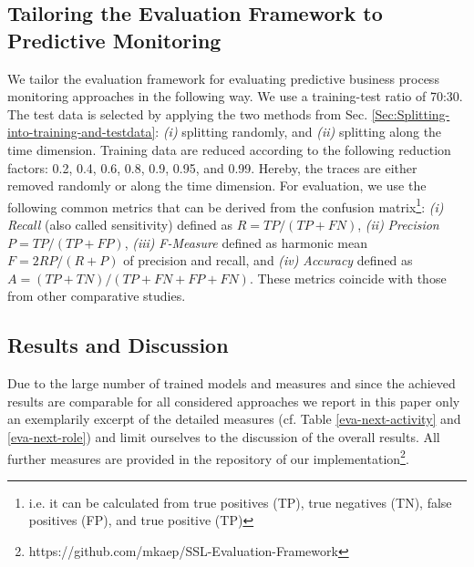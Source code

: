 \documentclass[runningheads]{llncs}
\begin{document}
\subsection{Tailoring the Evaluation Framework to Predictive Monitoring}
\vspace{-5pt}
We tailor the evaluation framework for evaluating predictive business process monitoring approaches in the following way. We use a training-test ratio of 70:30. The test data is selected by applying the two methods from Sec. \ref{Sec:Splitting-into-training-and-testdata}: \textit{(i)} splitting randomly, and \textit{(ii)} splitting along the time dimension. Training data are reduced according to the following reduction factors: 0.2, 0.4, 0.6, 0.8, 0.9, 0.95, and 0.99. Hereby, the traces are either removed randomly or along the time dimension. For evaluation, we use the following common metrics that can be derived from the confusion matrix\footnote{i.e. it can be calculated from true positives (TP), true negatives (TN), false positives (FP), and true positive (TP)}: \textit{(i)} \textit{Recall} (also called sensitivity) defined as $R = TP/(TP+FN)$, \textit{(ii)} \textit{Precision} $P = TP/(TP+FP)$, \textit{(iii)} \textit{F-Measure} defined as harmonic mean $F =2RP/(R+P)$ of precision and recall, and \textit{(iv)} \textit{Accuracy} defined as $A = (TP+TN)/(TP+FN+FP+FN)$. These metrics coincide with those from other comparative studies.
\vspace{-8pt}
\subsection{Results and Discussion}
\vspace{-6pt}
Due to the large number of trained models and measures and since the achieved results are comparable for all considered approaches we report in this paper only an exemplarily excerpt of the detailed measures (cf. Table \ref{eva-next-activity} and \ref{eva-next-role}) and limit ourselves to the discussion of the overall results. All further measures are provided in the repository of our implementation\footnote{https://github.com/mkaep/SSL-Evaluation-Framework}.
\end{document}
